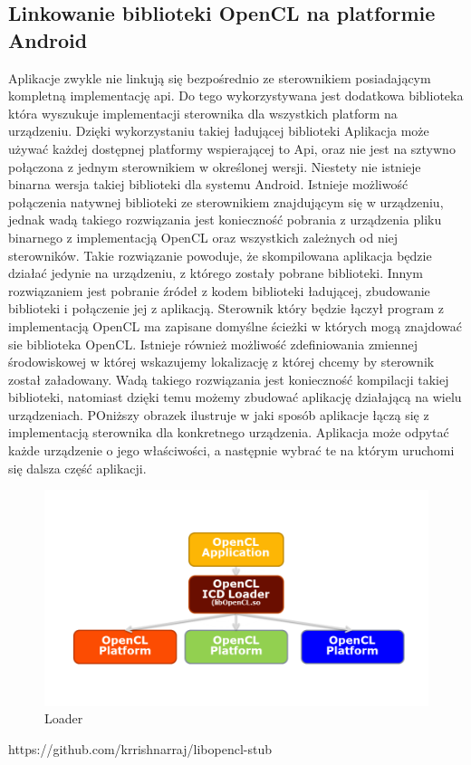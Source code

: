 \subsection{Linkowanie biblioteki OpenCL na platformie Android}
Aplikacje zwykle nie linkują się bezpośrednio ze sterownikiem posiadającym kompletną implementację api. Do tego wykorzystywana jest dodatkowa biblioteka która wyszukuje implementacji sterownika dla wszystkich platform na urządzeniu. Dzięki wykorzystaniu takiej ładującej biblioteki Aplikacja może używać każdej dostępnej platformy wspierającej to Api, oraz nie jest na sztywno połączona z jednym sterownikiem w określonej wersji.
Niestety nie istnieje binarna wersja takiej biblioteki dla systemu Android. Istnieje możliwość połączenia natywnej biblioteki ze sterownikiem znajdującym się w urządzeniu, jednak wadą takiego rozwiązania jest konieczność pobrania z urządzenia pliku binarnego z implementacją OpenCL oraz wszystkich zależnych od niej sterowników. Takie rozwiązanie powoduje, że skompilowana aplikacja będzie działać jedynie na urządzeniu, z którego zostały pobrane biblioteki.
Innym rozwiązaniem jest pobranie źródeł z kodem biblioteki ładującej, zbudowanie biblioteki i połączenie jej z aplikacją. Sterownik który będzie łączył program z implementacją OpenCL ma zapisane domyślne ścieżki w których mogą znajdować sie biblioteka OpenCL. Istnieje również możliwość zdefiniowania zmiennej środowiskowej w której wskazujemy lokalizację z której chcemy by sterownik został załadowany. Wadą takiego rozwiązania jest konieczność kompilacji takiej biblioteki, natomiast dzięki temu możemy zbudować aplikację działającą na wielu urządzeniach. POniższy obrazek ilustruje w jaki sposób aplikacje łączą się z implementacją sterownika dla konkretnego urządzenia. Aplikacja może odpytać każde urządzenie o jego właściwości, a następnie wybrać te na którym uruchomi się dalsza część aplikacji.
\begin{figure}[H]
	\includegraphics[scale=0.4]{imgs/icdLoader.png}
	\caption{Loader}
\end{figure}
https://github.com/krrishnarraj/libopencl-stub

